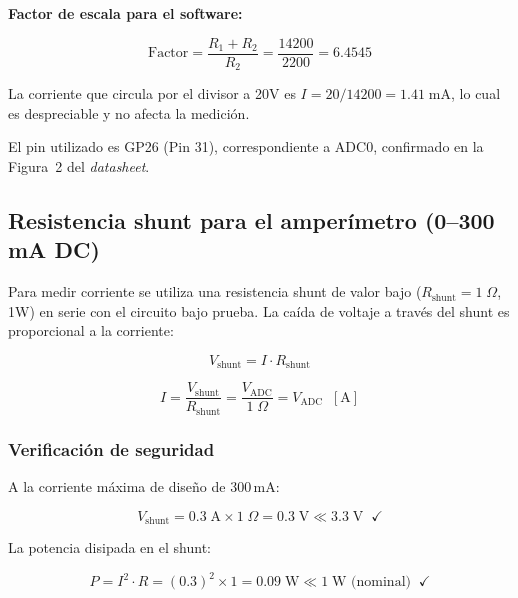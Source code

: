 \documentclass[letterpaper,12pt]{article}
\begin{document}
    \textbf{Factor de escala para el software:}

    \begin{equation}
        \text{Factor} = \frac{R_1 + R_2}{R_2} = \frac{14200}{2200} = \boxed{6.4545}
    \end{equation}

    La corriente que circula por el divisor a 20V es $I = 20/14200 = 1.41\;\text{mA}$, lo cual es despreciable y no afecta la medición.

    El pin utilizado es GP26 (Pin 31), correspondiente a ADC0, confirmado en la Figura~2 del \textit{datasheet}.

    \subsection{Resistencia shunt para el amperímetro (0--300 mA DC)}

    Para medir corriente se utiliza una resistencia shunt de valor bajo ($R_{\text{shunt}} = 1\;\Omega$, 1W) en serie con el circuito bajo prueba. La caída de voltaje a través del shunt es proporcional a la corriente:

    \begin{equation}
        V_{\text{shunt}} = I \cdot R_{\text{shunt}}
    \end{equation}

    \begin{equation}
        I = \frac{V_{\text{shunt}}}{R_{\text{shunt}}} = \frac{V_{\text{ADC}}}{1\;\Omega} = V_{\text{ADC}}\;\;[\text{A}]
    \end{equation}

    \subsubsection{Verificación de seguridad}

    A la corriente máxima de diseño de 300\,mA:

    \begin{equation}
        V_{\text{shunt}} = 0.3\;\text{A} \times 1\;\Omega = 0.3\;\text{V} \ll 3.3\;\text{V}\;\;\checkmark
    \end{equation}

    La potencia disipada en el shunt:

    \begin{equation}
        P = I^2 \cdot R = (0.3)^2 \times 1 = 0.09\;\text{W} \ll 1\;\text{W (nominal)}\;\;\checkmark
    \end{equation}
\end{document}
